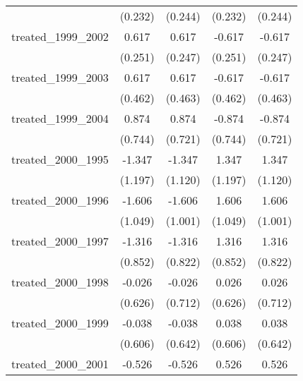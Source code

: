 {\begin{tabular}{l*{4}{c}}
            &     (0.232)         &     (0.244)         &     (0.232)         &     (0.244)         \\
[1em]
treated\_1999\_2002&       0.617\sym{*}  &       0.617\sym{*}  &      -0.617\sym{*}  &      -0.617\sym{*}  \\
            &     (0.251)         &     (0.247)         &     (0.251)         &     (0.247)         \\
[1em]
treated\_1999\_2003&       0.617         &       0.617         &      -0.617         &      -0.617         \\
            &     (0.462)         &     (0.463)         &     (0.462)         &     (0.463)         \\
[1em]
treated\_1999\_2004&       0.874         &       0.874         &      -0.874         &      -0.874         \\
            &     (0.744)         &     (0.721)         &     (0.744)         &     (0.721)         \\
[1em]
treated\_2000\_1995&      -1.347         &      -1.347         &       1.347         &       1.347         \\
            &     (1.197)         &     (1.120)         &     (1.197)         &     (1.120)         \\
[1em]
treated\_2000\_1996&      -1.606         &      -1.606         &       1.606         &       1.606         \\
            &     (1.049)         &     (1.001)         &     (1.049)         &     (1.001)         \\
[1em]
treated\_2000\_1997&      -1.316         &      -1.316         &       1.316         &       1.316         \\
            &     (0.852)         &     (0.822)         &     (0.852)         &     (0.822)         \\
[1em]
treated\_2000\_1998&      -0.026         &      -0.026         &       0.026         &       0.026         \\
            &     (0.626)         &     (0.712)         &     (0.626)         &     (0.712)         \\
[1em]
treated\_2000\_1999&      -0.038         &      -0.038         &       0.038         &       0.038         \\
            &     (0.606)         &     (0.642)         &     (0.606)         &     (0.642)         \\
[1em]
treated\_2000\_2001&      -0.526         &      -0.526         &       0.526         &       0.526         \\

\end{tabular}}
